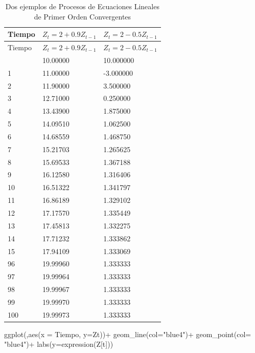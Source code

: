 \documentclass[
  a4paper,
]{article}
\newenvironment{Shaded}{}{}
\newcommand{\AttributeTok}[1]{\textcolor[rgb]{0.84,0.23,0.29}{#1}}
\newcommand{\FunctionTok}[1]{\textcolor[rgb]{0.44,0.26,0.76}{#1}}
\newcommand{\NormalTok}[1]{\textcolor[rgb]{0.14,0.16,0.18}{#1}}
\newcommand{\SpecialCharTok}[1]{\textcolor[rgb]{0.00,0.36,0.77}{#1}}
\newcommand{\StringTok}[1]{\textcolor[rgb]{0.01,0.18,0.38}{#1}}
\begin{document}
\hypertarget{tbl-table1}{}
\begin{longtable}[]{@{}lll@{}}
\caption{\label{tbl-table1}Dos ejemplos de Procesos de Ecuaciones
Lineales de Primer Orden Convergentes}\tabularnewline
\toprule\noalign{}
Tiempo & \(Z_t =2+0.9Z_{t-1}\) & \(Z_t = 2-0.5Z_{t-1}\) \\
\midrule\noalign{}
\endfirsthead
\toprule\noalign{}
Tiempo & \(Z_t =2+0.9Z_{t-1}\) & \(Z_t = 2-0.5Z_{t-1}\) \\
\midrule\noalign{}
\endhead
\bottomrule\noalign{}
\endlastfoot
0 & 10.00000 & 10.000000 \\
1 & 11.00000 & -3.000000 \\
2 & 11.90000 & 3.500000 \\
3 & 12.71000 & 0.250000 \\
4 & 13.43900 & 1.875000 \\
5 & 14.09510 & 1.062500 \\
6 & 14.68559 & 1.468750 \\
7 & 15.21703 & 1.265625 \\
8 & 15.69533 & 1.367188 \\
9 & 16.12580 & 1.316406 \\
10 & 16.51322 & 1.341797 \\
11 & 16.86189 & 1.329102 \\
12 & 17.17570 & 1.335449 \\
13 & 17.45813 & 1.332275 \\
14 & 17.71232 & 1.333862 \\
15 & 17.94109 & 1.333069 \\
96 & 19.99960 & 1.333333 \\
97 & 19.99964 & 1.333333 \\
98 & 19.99967 & 1.333333 \\
99 & 19.99970 & 1.333333 \\
100 & 19.99973 & 1.333333 \\
\end{longtable}

\begin{Shaded}
\begin{Highlighting}[]
\FunctionTok{ggplot}\NormalTok{(,}\FunctionTok{aes}\NormalTok{(}\AttributeTok{x =}\NormalTok{ Tiempo, }\AttributeTok{y=}\NormalTok{Zt))}\SpecialCharTok{+}
  \FunctionTok{geom\_line}\NormalTok{(}\AttributeTok{col=}\StringTok{"blue4"}\NormalTok{)}\SpecialCharTok{+}
  \FunctionTok{geom\_point}\NormalTok{(}\AttributeTok{col=} \StringTok{"blue4"}\NormalTok{)}\SpecialCharTok{+}
  \FunctionTok{labs}\NormalTok{(}\AttributeTok{y=}\FunctionTok{expression}\NormalTok{(Z[t]))}
\end{Highlighting}
\end{Shaded}
\end{document}
